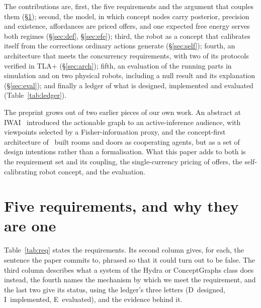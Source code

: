 \documentclass[10pt,twocolumn]{IEEEtran}
\begin{document}
The contributions are, first, the five requirements and the argument that couples them
(\S\ref{sec:req}); second, the model, in which concept nodes carry posterior, precision and existence,
affordances are priced offers, and one expected free energy serves both regimes
(\S\ref{sec:def}, \S\ref{sec:efe}); third, the robot as a concept that calibrates itself from the
corrections ordinary actions generate (\S\ref{sec:self}); fourth, an architecture that meets the
concurrency requirements, with two of its protocols verified in TLA+ (\S\ref{sec:arch}); fifth, an
evaluation of the running parts in simulation and on two physical robots, including a null result and
its explanation (\S\ref{sec:eval}); and finally a ledger of what is designed, implemented and
evaluated (Table~\ref{tab:ledger}).

The preprint grows out of two earlier pieces of our own work. An abstract at
IWAI~\cite{bustos2026active} introduced the actionable graph to an active-inference audience, with
viewpoints selected by a Fisher-information proxy, and the concept-first architecture
of~\cite{zapatacornejoConceptGuidedExplorationBuilding2025} built rooms and doors as cooperating
agents, but as a set of design intentions rather than a formalisation. What this paper adds to both is
the requirement set and its coupling, the single-currency pricing of offers, the self-calibrating
robot concept, and the evaluation.

\section{Five requirements, and why they are one}\label{sec:req}

Table~\ref{tab:req} states the requirements. Its second column gives, for each, the sentence the
paper commits to, phrased so that it could turn out to be false. The third column describes what a
system of the Hydra or ConceptGraphs class does instead, the fourth names the mechanism by which we
meet the requirement, and the last two give its status, using the ledger's three letters
(D~designed, I~implemented, E~evaluated), and the evidence behind it.
\end{document}
